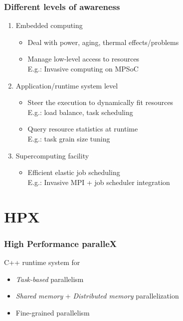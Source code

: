 \documentclass[compress]{beamer}
\begin{document}
\begin{frame}
	\frametitle{Different levels of awareness}
	\begin{enumerate}
		\item Embedded computing
		\begin{itemize}
			\item Deal with power, aging, thermal effects/problems
			\item Manage low-level access to resources\\
			E.g.: Invasive computing on MPSoC
		\end{itemize}
		\pause
		\item Application/runtime system level
		\begin{itemize}
			\item Steer the execution to dynamically fit resources\\
			E.g.: load balance, task scheduling
			\item Query resource statistics at runtime\\
			E.g.: task grain size tuning
		\end{itemize}
		\pause
		\item Supercomputing facility
		\begin{itemize}
			\item Efficient elastic job scheduling\\
			E.g.: Invasive MPI + job scheduler integration
		\end{itemize}
	\end{enumerate}
\end{frame}

\section{HPX}
\begin{frame}
	\frametitle{High Performance paralleX}
	\pause
	C++ runtime system for
	\vspace{3mm}
	\begin{itemize}
		\item \emph{Task-based} parallelism
		\item \emph{Shared memory} + \emph{Distributed memory} parallelization
		\item Fine-grained parallelism
	\end{itemize}
\end{frame}
\end{document}
